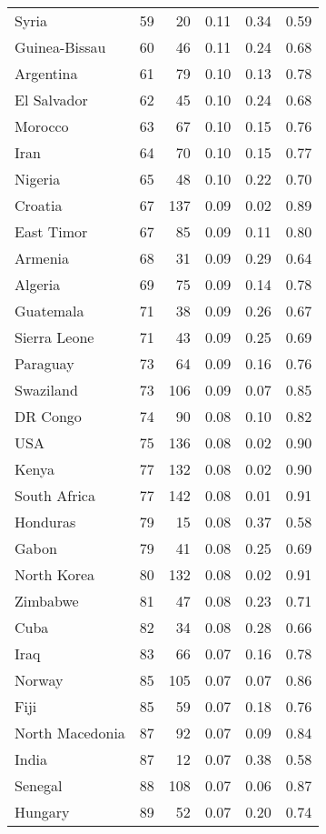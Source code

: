 \begin{longtable}[t]{lrrrrr}
Syria & 59 & 20 & 0.11 & 0.34 & 0.59\\
Guinea-Bissau & 60 & 46 & 0.11 & 0.24 & 0.68\\
\addlinespace
Argentina & 61 & 79 & 0.10 & 0.13 & 0.78\\
El Salvador & 62 & 45 & 0.10 & 0.24 & 0.68\\
Morocco & 63 & 67 & 0.10 & 0.15 & 0.76\\
Iran & 64 & 70 & 0.10 & 0.15 & 0.77\\
Nigeria & 65 & 48 & 0.10 & 0.22 & 0.70\\
\addlinespace
Croatia & 67 & 137 & 0.09 & 0.02 & 0.89\\
East Timor & 67 & 85 & 0.09 & 0.11 & 0.80\\
Armenia & 68 & 31 & 0.09 & 0.29 & 0.64\\
Algeria & 69 & 75 & 0.09 & 0.14 & 0.78\\
Guatemala & 71 & 38 & 0.09 & 0.26 & 0.67\\
\addlinespace
Sierra Leone & 71 & 43 & 0.09 & 0.25 & 0.69\\
Paraguay & 73 & 64 & 0.09 & 0.16 & 0.76\\
Swaziland & 73 & 106 & 0.09 & 0.07 & 0.85\\
DR Congo & 74 & 90 & 0.08 & 0.10 & 0.82\\
USA & 75 & 136 & 0.08 & 0.02 & 0.90\\
\addlinespace
Kenya & 77 & 132 & 0.08 & 0.02 & 0.90\\
South Africa & 77 & 142 & 0.08 & 0.01 & 0.91\\
Honduras & 79 & 15 & 0.08 & 0.37 & 0.58\\
Gabon & 79 & 41 & 0.08 & 0.25 & 0.69\\
North Korea & 80 & 132 & 0.08 & 0.02 & 0.91\\
\addlinespace
Zimbabwe & 81 & 47 & 0.08 & 0.23 & 0.71\\
Cuba & 82 & 34 & 0.08 & 0.28 & 0.66\\
Iraq & 83 & 66 & 0.07 & 0.16 & 0.78\\
Norway & 85 & 105 & 0.07 & 0.07 & 0.86\\
Fiji & 85 & 59 & 0.07 & 0.18 & 0.76\\
\addlinespace
North Macedonia & 87 & 92 & 0.07 & 0.09 & 0.84\\
India & 87 & 12 & 0.07 & 0.38 & 0.58\\
Senegal & 88 & 108 & 0.07 & 0.06 & 0.87\\
Hungary & 89 & 52 & 0.07 & 0.20 & 0.74\\

\end{longtable}
